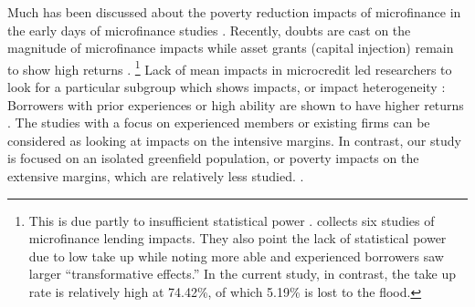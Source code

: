 	Much has been discussed about the poverty reduction impacts of microfinance in the early days of microfinance studies \citep{PittKhandker1998, Morduch1999}. Recently, doubts are cast on the magnitude of microfinance impacts \citep{BanerjeeKarlanZinman2015, DuvendackMader2019, Meager2019} while asset grants (capital injection) remain to show high returns \citep{deMel2008, DeMel2014, FafchampsFlypaper2014, BandieraBRAC2017, BueraKaboskiShin2020}. \footnote{This is due partly to insufficient statistical power \citep{MckenzieWoodruff2013}. \citet{BanerjeeKarlanZinman2015} collects six studies of microfinance lending impacts. They also point the lack of statistical power due to low take up while noting more able and experienced borrowers saw larger ``transformative effects.'' %
	In the current study, in contrast, the take up rate is relatively high at 74.42\%, of which 5.19\% is lost to the flood.  } Lack of mean impacts in microcredit led researchers to look for a particular subgroup which shows impacts, or impact heterogeneity \citep{Banerjee2017HyderabadFollowup}: Borrowers with prior experiences or high ability are shown to have higher returns \citep{Banerjee2015Miracle, Mckenzie2017Spurring, Banerjee2019MFPovertyTrap, BueraKaboskiShin2020}. The studies with a focus on experienced members or existing firms can be considered as looking at impacts on the intensive margins. In contrast, our study is focused on an isolated greenfield population, or poverty impacts on the extensive margins, which are relatively less studied.  {\citep{CullMorduch2018, BueraKaboskiShin2020}}.

